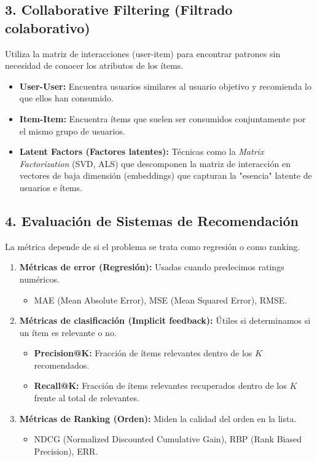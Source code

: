 \subsection{3. Collaborative Filtering (Filtrado colaborativo)}
Utiliza la matriz de interacciones (user-item) para encontrar patrones sin necesidad de conocer los atributos de los ítems.

\begin{itemize}
	\item \textbf{User-User:} Encuentra usuarios similares al usuario objetivo y recomienda lo que ellos han consumido.
	\item \textbf{Item-Item:} Encuentra ítems que suelen ser consumidos conjuntamente por el mismo grupo de usuarios.
	\item \textbf{Latent Factors (Factores latentes):} Técnicas como la \emph{Matrix Factorization} (SVD, ALS) que descomponen la matriz de interacción en vectores de baja dimensión (embeddings) que capturan la "esencia" latente de usuarios e ítems.
\end{itemize}

\subsection{4. Evaluación de Sistemas de Recomendación}
La métrica depende de si el problema se trata como regresión o como ranking.

\begin{enumerate}
	\item \textbf{Métricas de error (Regresión):} Usadas cuando predecimos ratings numéricos.
	\begin{itemize}
		\item MAE (Mean Absolute Error), MSE (Mean Squared Error), RMSE.
	\end{itemize}
	\item \textbf{Métricas de clasificación (Implicit feedback):} Útiles si determinamos si un ítem es relevante o no.
	\begin{itemize}
		\item \textbf{Precision@K:} Fracción de ítems relevantes dentro de los $K$ recomendados.
		\item \textbf{Recall@K:} Fracción de ítems relevantes recuperados dentro de los $K$ frente al total de relevantes.
	\end{itemize}
	\item \textbf{Métricas de Ranking (Orden):} Miden la calidad del orden en la lista.
	\begin{itemize}
		\item NDCG (Normalized Discounted Cumulative Gain), RBP (Rank Biased Precision), ERR.
	\end{itemize}
\end{enumerate}

